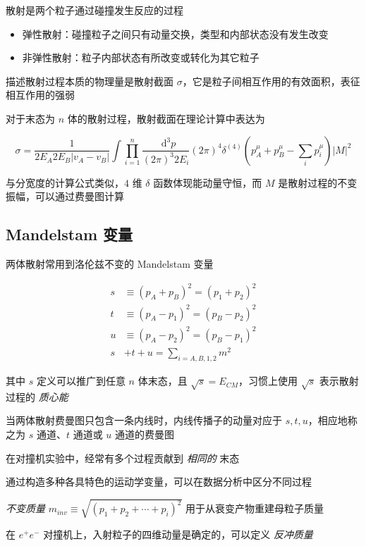 \documentclass[oneside,a4paper,openany,11pt]{ctexbook}
\newcommand*{\dif}{\mathop{}\!\mathrm{d}} %
\begin{document}
散射是两个粒子通过碰撞发生反应的过程

\begin{itemize}
    \item 弹性散射：碰撞粒子之间只有动量交换，类型和内部状态没有发生改变
    \item 非弹性散射：粒子内部状态有所改变或转化为其它粒子
\end{itemize}

描述散射过程本质的物理量是散射截面 $\sigma$，它是粒子间相互作用的有效面积，表征相互作用的强弱

对于末态为 $n$ 体的散射过程，散射截面在理论计算中表达为

\begin{equation}
    \sigma = \frac{1}{2 E_A 2 E_B |v_A-v_B|} \int \prod_{i=1}^n \frac{\dif^3 p}{(2\pi)^3 2 E_i} (2\pi)^4 \delta^{(4)} (p^\mu_A + p^\mu_B - \sum_i p^\mu_i) |M|^2
\end{equation}

与分宽度的计算公式类似，$4$ 维 $\delta$ 函数体现能动量守恒，而 $M$ 是散射过程的不变振幅，可以通过费曼图计算

\subsection{Mandelstam 变量}

两体散射常用到洛伦兹不变的 Mandelstam 变量

\begin{align}
    s &\equiv (p_A + p_B)^2 = (p_1 + p_2)^2 \\
    t &\equiv (p_A - p_1)^2 = (p_B - p_2)^2 \\
    u &\equiv (p_A - p_2)^2 = (p_B - p_1)^2 \\
    s &+t+u = \sum_{i=A,B,1,2} m^2
\end{align}

其中 $s$ 定义可以推广到任意 $n$ 体末态，且 $\sqrt{s}=E_{CM}$，习惯上使用 $\sqrt{s}$ 表示散射过程的 \emph{质心能}

当两体散射费曼图只包含一条内线时，内线传播子的动量对应于 $s, t, u$，相应地称之为 $s$ 通道、$t$ 通道或 $u$ 通道的费曼图

在对撞机实验中，经常有多个过程贡献到 \emph{相同的} 末态

通过构造多种各具特色的运动学变量，可以在数据分析中区分不同过程

\emph{不变质量} $m_{inv} \equiv \sqrt{(p_1 + p_2 + \cdots + p_i)^2}$ 用于从衰变产物重建母粒子质量

在 $e^+ e^-$ 对撞机上，入射粒子的四维动量是确定的，可以定义 \emph{反冲质量}
\end{document}

